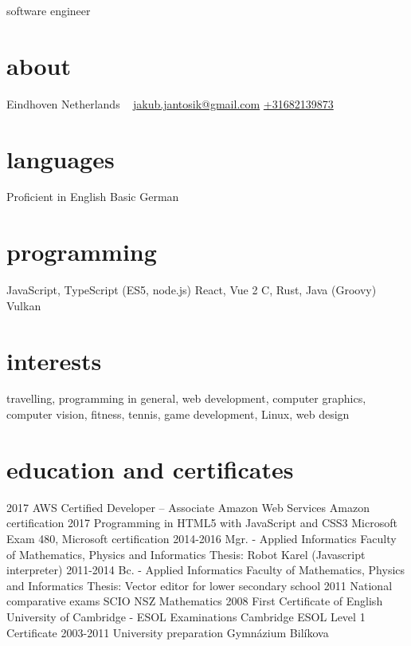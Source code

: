 \documentclass[]{friggeri-cv}
\begin{document}
       {software engineer}

\begin{aside}
  \section{about}
    Eindhoven
    Netherlands
    ~
    \href{mailto:jakub.jantosik@gmail.com}{jakub.jantosik@gmail.com}
    \href{tel:+31682139873}{+31682139873}
  \section{languages}
    Proficient in English
    Basic German
  \section{programming}
   JavaScript, TypeScript
    (ES5, node.js)
    React, Vue 2
    C, Rust, Java (Groovy)
    Vulkan
\end{aside}

\section{interests}

travelling, programming in general, web development, computer graphics, computer vision, fitness, tennis, game development, Linux,  web design

\section{education and certificates}

\begin{entrylist}
  \entry
    {2017}
    {AWS Certified Developer – Associate}
    {Amazon Web Services}
    {Amazon certification}
  \entry
    {2017}
    {Programming in HTML5 with JavaScript and CSS3}
    {Microsoft}
    {Exam 480, Microsoft certification}
  \entry
    {2014-2016}
    {Mgr. - Applied Informatics}
    {Faculty of Mathematics, Physics and Informatics}
    {Thesis: Robot Karel (Javascript interpreter)}
  \entry
    {2011-2014}
    {Bc. - Applied Informatics}
    {Faculty of Mathematics, Physics and Informatics}
    {Thesis: Vector editor for lower secondary school}
  \entry
    {2011}
    {National comparative exams}
    {SCIO}
    {NSZ Mathematics}
  \entry
    {2008}
    {First Certificate of English}
    {University of Cambridge - ESOL Examinations}
    {Cambridge ESOL Level 1 Certificate}
  \entry
    {2003-2011}
    {University preparation}
    {Gymnázium Bilíkova}
    {}
\end{entrylist}
\end{document}
